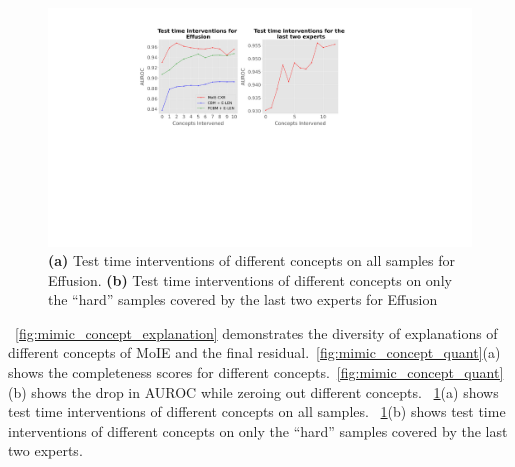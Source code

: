 \begin{figure}[h]
\centering
\includegraphics[width=1.0\textwidth]
{figures/Supp/mimic_concept_tti.pdf}
\caption{\textbf{(a)} Test time interventions of different concepts on all samples for Effusion.
\textbf{(b)} Test time interventions of different concepts on only the ``hard'' samples covered by the last two experts for Effusion}
\label{fig:mimic_concept_tti}
\end{figure}

~\cref{fig:mimic_concept_explanation} demonstrates the diversity of explanations of different concepts of MoIE and the final residual.~\cref{fig:mimic_concept_quant}(a) shows the completeness scores for different concepts.~\cref{fig:mimic_concept_quant}(b) shows the drop in AUROC while zeroing out different concepts. ~\cref{fig:mimic_concept_tti}(a) shows test time interventions of different concepts on all samples. ~\cref{fig:mimic_concept_tti}(b) shows test time interventions of different concepts on only the ``hard'' samples covered by the last two experts.


